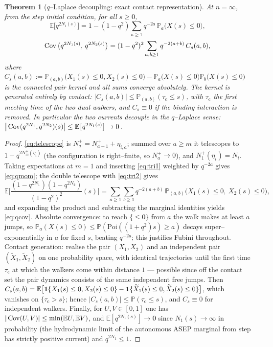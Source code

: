 \documentclass[11pt]{article}
\theoremstyle{plain}
\newtheorem{theorem}{Theorem}[section]
\theoremstyle{definition}
\theoremstyle{remark}
\newcommand{\E}{\mathbb{E}}\newcommand{\PP}{\mathbb{P}}\newcommand{\dd}{\,\mathrm{d}}
\begin{document}
\begin{theorem}[$q$--Laplace decoupling: exact contact representation]\label{thm:cov}
At $n=\infty$, from the step initial condition, for all $s\ge0$,
\begin{equation}\label{eq:qmom}
  \E\big[q^{2N_i(s)}\big]=1-(1-q^2)\sum_{a\ge1}q^{-2a}\,\PP_a\big(X(s)\le0\big),
\end{equation}
\begin{equation}\label{eq:qcov}
  \operatorname{Cov}\big(q^{2N_1(s)},\,q^{2N_2(s)}\big)
  =(1-q^2)^2\sum_{a,b\ge1}q^{-2(a+b)}\,C_s(a,b),
\end{equation}
where
$C_s(a,b):=\PP_{(a,b)}\big(X_1(s)\le0,X_2(s)\le0\big)
-\PP_a\big(X(s)\le0\big)\PP_b\big(X(s)\le0\big)$ is the connected pair kernel and all
sums converge absolutely. The kernel is generated entirely by contact:
$|C_s(a,b)|\le\PP_{(a,b)}(\tau_{\mathrm c}\le s)$, with $\tau_{\mathrm c}$ the first
meeting time of the two dual walkers, and $C_s\equiv0$ if the binding interaction is
removed. In particular the two currents decouple in the $q$--Laplace sense:
$\big|\Cov(q^{2N_1},q^{2N_2})(s)\big|\le\E\big[q^{2N_1(s)}\big]\to0$.
\end{theorem}
\begin{proof}
\eqref{eq:telescope} is $N^+_a=N^+_{a+1}+\eta_{i,a}$; summed over $a\ge m$ it
telescopes to $1-q^{2N^+_m(\eta_i)}$ (the configuration is right--finite, so
$N^+_a\to0$), and $N^+_1(\eta_i)=N_i$. Taking expectations at $m=1$ and inserting
\eqref{eq:tri1} weighted by $q^{-2a}$ gives \eqref{eq:qmom}; the double telescope
with \eqref{eq:tri2} gives
\[
  \E\Big[\frac{(1-q^{2N_1})(1-q^{2N_2})}{(1-q^2)^2}(s)\Big]
  =\sum_{a\ge1}\sum_{b\ge1}q^{-2(a+b)}\,\PP_{(a,b)}\big(X_1(s)\le0,\ X_2(s)\le0\big),
\]
and expanding the product and subtracting the marginal identities yields
\eqref{eq:qcov}. Absolute convergence: to reach $\{\le0\}$ from $a$ the walk makes at
least $a$ jumps, so $\PP_a(X(s)\le0)\le\PP(\mathrm{Poi}((1+q^2)s)\ge a)$ decays
super--exponentially in $a$ for fixed $s$, beating $q^{-2a}$; this justifies Fubini
throughout. Contact generation: realise the pair $(X_1,X_2)$ and an independent pair
$(\widetilde X_1,\widetilde X_2)$ on one probability space, with identical
trajectories until the first time $\tau_{\mathrm c}$ at which the walkers come within
distance $1$ --- possible since off the contact set the pair dynamics consists of the
same independent free jumps. Then
$C_s(a,b)=\E\big[\bone\{X_1(s)\le0,X_2(s)\le0\}
-\bone\{\widetilde X_1(s)\le0,\widetilde X_2(s)\le0\}\big]$, which vanishes on
$\{\tau_{\mathrm c}>s\}$; hence $|C_s(a,b)|\le\PP(\tau_{\mathrm c}\le s)$, and
$C_s\equiv0$ for independent walkers. Finally, for $U,V\in[0,1]$ one has
$|\Cov(U,V)|\le\min(\E U,\E V)$, and $\E[q^{2N_1(s)}]\to0$ since $N_1(s)\to\infty$
in probability (the hydrodynamic limit of the autonomous ASEP marginal from step has
strictly positive current) and $q^{2N_1}\le1$.
\end{proof}
\end{document}
